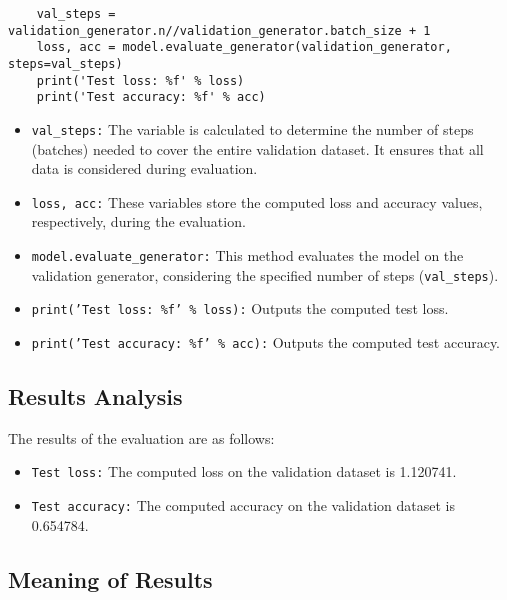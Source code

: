 \documentclass{article}
\begin{document}
\begin{verbatim}
    val_steps = validation_generator.n//validation_generator.batch_size + 1
    loss, acc = model.evaluate_generator(validation_generator, steps=val_steps)
    print('Test loss: %f' % loss)
    print('Test accuracy: %f' % acc)
\end{verbatim}

\begin{itemize}
    \item \texttt{val\_steps:} The variable is calculated to determine the number of steps (batches) needed to cover the entire validation dataset. It ensures that all data is considered during evaluation.

    \item \texttt{loss, acc:} These variables store the computed loss and accuracy values, respectively, during the evaluation.

    \item \texttt{model.evaluate\_generator:} This method evaluates the model on the validation generator, considering the specified number of steps (\texttt{val\_steps}).

    \item \texttt{print('Test loss: \%f' \% loss):} Outputs the computed test loss.

    \item \texttt{print('Test accuracy: \%f' \% acc):} Outputs the computed test accuracy.

\end{itemize}

\subsection{Results Analysis}

The results of the evaluation are as follows:

\begin{itemize}
    \item \texttt{Test loss:} The computed loss on the validation dataset is 1.120741.

    \item \texttt{Test accuracy:} The computed accuracy on the validation dataset is 0.654784.

\end{itemize}

\subsection{Meaning of Results}
\end{document}
